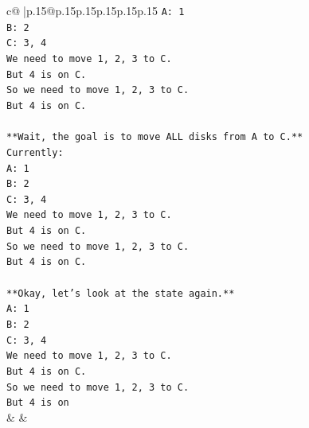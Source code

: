 \documentclass{article}
\begin{document}
{\begin{supertabular}{c@{$\;$}|p{.15\linewidth}@{}p{.15\linewidth}p{.15\linewidth}p{.15\linewidth}p{.15\linewidth}p{.15\linewidth}}
{{{\texttt{A: 1} \\
\texttt{B: 2} \\
\texttt{C: 3, 4} \\
\texttt{We need to move 1, 2, 3 to C.} \\
\texttt{But 4 is on C.} \\
\texttt{So we need to move 1, 2, 3 to C.} \\
\texttt{But 4 is on C.} \\
\\ 
\texttt{**Wait, the goal is to move ALL disks from A to C.**} \\
\texttt{Currently:} \\
\texttt{A: 1} \\
\texttt{B: 2} \\
\texttt{C: 3, 4} \\
\texttt{We need to move 1, 2, 3 to C.} \\
\texttt{But 4 is on C.} \\
\texttt{So we need to move 1, 2, 3 to C.} \\
\texttt{But 4 is on C.} \\
\\ 
\texttt{**Okay, let's look at the state again.**} \\
\texttt{A: 1} \\
\texttt{B: 2} \\
\texttt{C: 3, 4} \\
\texttt{We need to move 1, 2, 3 to C.} \\
\texttt{But 4 is on C.} \\
\texttt{So we need to move 1, 2, 3 to C.} \\
\texttt{But 4 is on} \\
            }
        }
    }
    & & \\ \\


\end{supertabular}}
\end{document}

